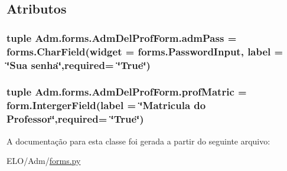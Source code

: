 \subsection{Atributos}
\hypertarget{classAdm_1_1forms_1_1AdmDelProfForm_a5c75c479d2d63fb207af1fd9eb1d85ad}{
\subsubsection[{adm\-Pass}]{\setlength{\rightskip}{0pt plus 5cm}tuple Adm.\-forms.\-Adm\-Del\-Prof\-Form.\-adm\-Pass = forms.\-Char\-Field(widget = forms.\-Password\-Input, label = \char`\"{}Sua senha\char`\"{},required= \char`\"{}True\char`\"{})\hspace{0.3cm}{\ttfamily [static]}}}\label{classAdm_1_1forms_1_1AdmDelProfForm_a5c75c479d2d63fb207af1fd9eb1d85ad}
\hypertarget{classAdm_1_1forms_1_1AdmDelProfForm_a3b53155ed7b63a0ad994c47305061ca1}{
\subsubsection[{prof\-Matric}]{\setlength{\rightskip}{0pt plus 5cm}tuple Adm.\-forms.\-Adm\-Del\-Prof\-Form.\-prof\-Matric = form.\-Interger\-Field(label = \char`\"{}Matricula do Professor\char`\"{},required= \char`\"{}True\char`\"{})\hspace{0.3cm}{\ttfamily [static]}}}\label{classAdm_1_1forms_1_1AdmDelProfForm_a3b53155ed7b63a0ad994c47305061ca1}


A documentação para esta classe foi gerada a partir do seguinte arquivo\-:\begin{DoxyCompactItemize}
\item 
E\-L\-O/\-Adm/\hyperlink{Adm_2forms_8py}{forms.\-py}\end{DoxyCompactItemize}
